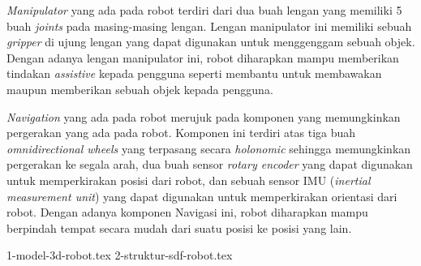 \emph{Manipulator} yang ada pada robot terdiri dari dua buah lengan yang memiliki 5 buah \emph{joints} pada masing-masing lengan.
Lengan manipulator ini memiliki sebuah \emph{gripper} di ujung lengan yang dapat digunakan untuk menggenggam sebuah objek.
Dengan adanya lengan manipulator ini,
  robot diharapkan mampu memberikan tindakan \emph{assistive} kepada pengguna seperti membantu untuk membawakan maupun memberikan sebuah objek kepada pengguna.

\emph{Navigation} yang ada pada robot merujuk pada komponen yang memungkinkan pergerakan yang ada pada robot.
Komponen ini terdiri atas tiga buah \emph{omnidirectional wheels} yang terpasang secara \emph{holonomic} sehingga memungkinkan pergerakan ke segala arah,
  dua buah sensor \emph{rotary encoder} yang dapat digunakan untuk memperkirakan posisi dari robot,
  dan sebuah sensor IMU (\emph{inertial measurement unit}) yang dapat digunakan untuk memperkirakan orientasi dari robot.
Dengan adanya komponen Navigasi ini,
  robot diharapkan mampu berpindah tempat secara mudah dari suatu posisi ke posisi yang lain.

{1-model-3d-robot.tex}
{2-struktur-sdf-robot.tex}
